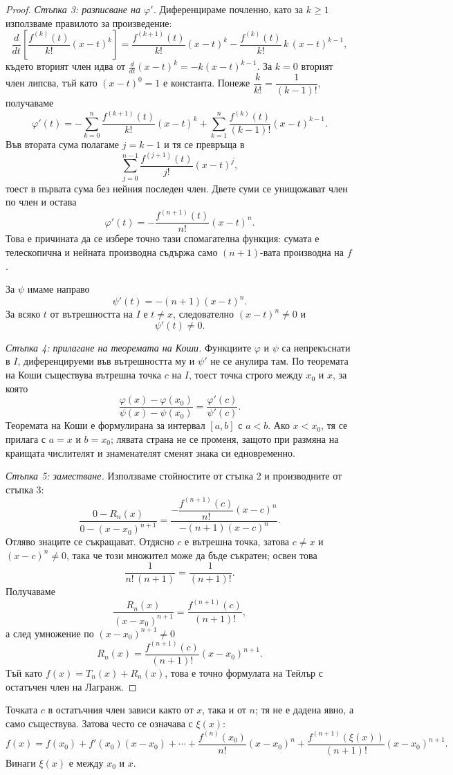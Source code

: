 \begin{proof}
\emph{Стъпка 3: разписване на $\varphi'$.} Диференцираме почленно, като за $k\geq 1$ използваме правилото за произведение:
\[
\frac{d}{dt}\left[\frac{f^{(k)}(t)}{k!}(x-t)^k\right]
=
\frac{f^{(k+1)}(t)}{k!}(x-t)^k
-
\frac{f^{(k)}(t)}{k!}\,k\,(x-t)^{k-1},
\]
където вторият член идва от $\frac{d}{dt}(x-t)^k=-k(x-t)^{k-1}$. За $k=0$ вторият член липсва, тъй като $(x-t)^0=1$ е константа. Понеже $\dfrac{k}{k!}=\dfrac{1}{(k-1)!}$, получаваме
\[
\varphi'(t)
=
-\sum_{k=0}^{n}\frac{f^{(k+1)}(t)}{k!}(x-t)^k
+
\sum_{k=1}^{n}\frac{f^{(k)}(t)}{(k-1)!}(x-t)^{k-1}.
\]
Във втората сума полагаме $j=k-1$ и тя се превръща в
\[
\sum_{j=0}^{n-1}\frac{f^{(j+1)}(t)}{j!}(x-t)^{j},
\]
тоест в първата сума без нейния последен член. Двете суми се унищожават член по член и остава
\[
\varphi'(t)
=
-\frac{f^{(n+1)}(t)}{n!}(x-t)^n.
\]
Това е причината да се избере точно тази спомагателна функция: сумата е телескопична и нейната производна съдържа само $(n+1)$-вата производна на $f$.

За $\psi$ имаме направо
\[
\psi'(t)=-(n+1)(x-t)^n.
\]
За всяко $t$ от вътрешността на $I$ е $t\ne x$, следователно $(x-t)^n\ne 0$ и
\[
\psi'(t)\ne 0.
\]

\emph{Стъпка 4: прилагане на теоремата на Коши.} Функциите $\varphi$ и $\psi$ са непрекъснати в $I$, диференцируеми във вътрешността му и $\psi'$ не се анулира там. По теоремата на Коши съществува вътрешна точка $c$ на $I$, тоест точка строго между $x_0$ и $x$, за която
\[
\frac{\varphi(x)-\varphi(x_0)}
{\psi(x)-\psi(x_0)}
=
\frac{\varphi'(c)}{\psi'(c)}.
\]
Теоремата на Коши е формулирана за интервал $[a,b]$ с $a<b$. Ако $x<x_0$, тя се прилага с $a=x$ и $b=x_0$; лявата страна не се променя, защото при размяна на краищата числителят и знаменателят сменят знака си едновременно.

\emph{Стъпка 5: заместване.} Използваме стойностите от стъпка 2 и производните от стъпка 3:
\[
\frac{0-R_n(x)}{0-(x-x_0)^{n+1}}
=
\frac{
-\dfrac{f^{(n+1)}(c)}{n!}(x-c)^n
}{
-(n+1)(x-c)^n
}.
\]
Отляво знаците се съкращават. Отдясно $c$ е вътрешна точка, затова $c\ne x$ и $(x-c)^n\ne 0$, така че този множител може да бъде съкратен; освен това
\[
\frac{1}{n!\,(n+1)}=\frac{1}{(n+1)!}.
\]
Получаваме
\[
\frac{R_n(x)}{(x-x_0)^{n+1}}
=
\frac{f^{(n+1)}(c)}{(n+1)!},
\]
а след умножение по $(x-x_0)^{n+1}\ne 0$
\[
R_n(x)
=
\frac{f^{(n+1)}(c)}{(n+1)!}(x-x_0)^{n+1}.
\]
Тъй като $f(x)=T_n(x)+R_n(x)$, това е точно формулата на Тейлър с остатъчен член на Лагранж.
\end{proof}

\begin{remark}
Точката $c$ в остатъчния член зависи както от $x$, така и от $n$; тя не е дадена явно, а само съществува. Затова често се означава с $\xi(x)$:
\[
f(x)
=
f(x_0)+f'(x_0)(x-x_0)+\cdots+
\frac{f^{(n)}(x_0)}{n!}(x-x_0)^n
+
\frac{f^{(n+1)}(\xi(x))}{(n+1)!}(x-x_0)^{n+1}.
\]
Винаги $\xi(x)$ е между $x_0$ и $x$.
\end{remark}

